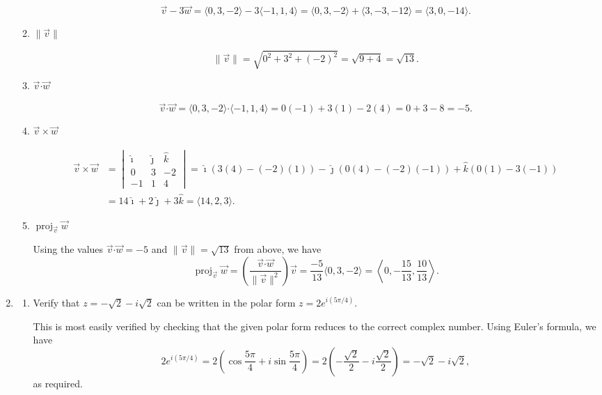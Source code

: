 \documentclass[12pt]{article}
\newcommand{\points}[1]{\marginpar{\hspace{24pt}[#1]}}
\newcommand{\dotp}{\boldsymbol{\cdot}}
\newcommand{\len}[1]{\lVert #1\rVert}
\begin{document}
\begin{enumerate}
\begin{enumerate}
\[
 \vec{v}-3\vec{w} = \langle 0,3,-2\rangle-3\langle -1,1,4\rangle = \langle 0,3,-2\rangle+\langle 3,-3,-12\rangle = \langle 3,0,-14\rangle.
\]

  
 \item $\len{\vec{v}}$ \points{2}

\[
 \len{\vec{v}} = \sqrt{0^2+3^2+(-2)^2} = \sqrt{9+4}=\sqrt{13}.
\]


 \item $\vec{v}\dotp\vec{w}$ \points{2}

\[
 \vec{v}\dotp\vec{w}=\langle 0,3,-2\rangle\dotp \langle -1,1,4\rangle = 0(-1)+3(1)-2(4) = 0+3-8=-5.
\]


 \item $\vec{v}\times \vec{w}$ \points{4}

\begin{align*}
 \vec{v}\times\vec{w} &= \begin{vmatrix}
                         \hat{\imath} & \hat{\jmath} & \hat{k}\\
			 0&3&-2\\-1&1&4
                        \end{vmatrix} = \hat{\imath}(3(4)-(-2)(1))-\hat{\jmath}(0(4)-(-2)(-1))+\hat{k}(0(1)-3(-1))\\
& = 14\hat{\imath}+2\hat{\jmath}+3\hat{k} = \langle 14,2,3\rangle.
\end{align*}

 \item $\operatorname{proj}_{\vec{v}}\vec{w}$ \points{4}

Using the values $\vec{v}\dotp\vec{w} = -5$ and $\len{\vec{v}} = \sqrt{13}$ from above, we have
\[
 \operatorname{proj}_{\vec{v}}\vec{w} = \left(\frac{\vec{v}\dotp\vec{w}}{\len{\vec{v}}^2}\right)\vec{v} = \frac{-5}{13}\langle 0,3,-2\rangle = \left\langle 0,-\frac{15}{13},\frac{10}{13}\right\rangle.
\]
\end{enumerate}
\newpage

\item 
\begin{enumerate}
 \item Verify that $z=-\sqrt{2}-i\sqrt{2}$ can be written in the polar form $z=2e^{i(5\pi/4)}$. \points{3}

This is most easily verified by checking that the given polar form reduces to the correct complex number. Using Euler's formula, we have
\[
 2e^{i(5\pi/4)} = 2\left(\cos\frac{5\pi}{4}+i\sin\frac{5\pi}{4}\right) = 2\left(-\frac{\sqrt{2}}{2}-i\frac{\sqrt{2}}{2}\right) = -\sqrt{2}-i\sqrt{2},
\]
as required.


\end{enumerate}
\end{enumerate}
\end{document}
